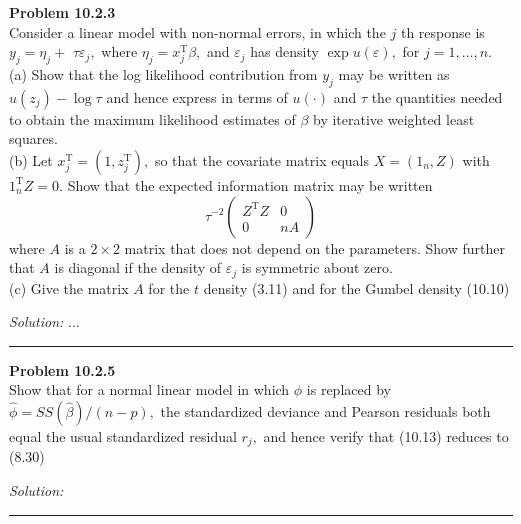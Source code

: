 \documentclass[a4paper, 11pt]{article}
\newenvironment{problem}[2][Problem]
    { \begin{mdframed}[backgroundcolor=gray!20] \textbf{#1 #2} \\}
    {  \end{mdframed}}
\newenvironment{solution}
    {\textit{Solution:}}
    {}
\begin{document}
\begin{problem}{10.2.3}
    Consider a linear model with non-normal errors, in which the $j$ th response is $y_{j}=\eta_{j}+$ $\tau \varepsilon_{j},$ where $\eta_{j}=x_{j}^{\mathrm{T}} \beta,$ and $\varepsilon_{j}$ has density $\exp u(\varepsilon),$ for $j=1, \ldots, n.$\\
    (a) Show that the log likelihood contribution from $y_{j}$ may be written as $u\left(z_{j}\right)-\log \tau$ and hence express in terms of $u(\cdot)$ and $\tau$ the quantities needed to obtain the maximum likelihood estimates of $\beta$ by iterative weighted least squares.
    \\(b) Let $x_{j}^{\mathrm{T}}=\left(1, z_{j}^{\mathrm{T}}\right),$ so that the covariate matrix equals $X=\left(1_{n}, Z\right)$ with $1_{n}^{\mathrm{T}} Z=0 .$ Show that the expected information matrix may be written
    $$
    \tau^{-2}\left(\begin{array}{cc}
    Z^{\mathrm{T}} Z & 0 \\
    0 & n A
    \end{array}\right)
    $$
    where $A$ is a $2 \times 2$ matrix that does not depend on the parameters. Show further that $A$ is diagonal if the density of $\varepsilon_{j}$ is symmetric about zero.\\
    (c) Give the matrix $A$ for the $t$ density (3.11) and for the Gumbel density (10.10)
\end{problem}
  \begin{solution}
  ...
  \end{solution}
  
  \noindent\rule{7in}{2.8pt}

\begin{problem}{10.2.5}
    Show that for a normal linear model in which $\phi$ is replaced by $\widehat{\phi}=S S(\widehat{\beta}) /(n-p),$ the standardized deviance and Pearson residuals both equal the usual standardized residual $r_{j},$ and hence verify that (10.13) reduces to (8.30)

\end{problem}
\begin{solution}

\end{solution}

\noindent\rule{7in}{2.8pt}

\end{document}
